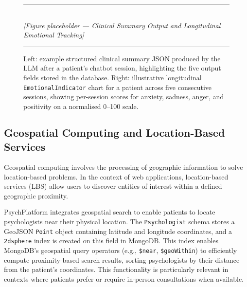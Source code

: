 \begin{figure}[H]
  \centering
  \rule{0.85\textwidth}{0.4pt}\\[6pt]
  {\small\itshape [Figure placeholder — Clinical Summary Output and Longitudinal Emotional Tracking]}
  \rule{0.85\textwidth}{0.4pt}
  \caption{Left: example structured clinical summary JSON produced by the LLM
           after a patient's chatbot session, highlighting the five output fields
           stored in the database. Right: illustrative longitudinal
           \texttt{EmotionalIndicator} chart for a patient across five
           consecutive sessions, showing per-session scores for anxiety, sadness,
           anger, and positivity on a normalised 0--100 scale.}
  \label{fig:emotion-tracking}
\end{figure}

\subsection{Geospatial Computing and Location-Based Services}
\label{subsec:geo}

Geospatial computing involves the processing of geographic information to solve
location-based problems. In the context of web applications, location-based
services (LBS) allow users to discover entities of interest within a defined
geographic proximity.

PsychPlatform integrates geospatial search to enable patients to locate
psychologists near their physical location. The \texttt{Psychologist} schema
stores a GeoJSON \texttt{Point} object containing latitude and longitude
coordinates, and a \texttt{2dsphere} index is created on this field in MongoDB.
This index enables MongoDB's geospatial query operators (e.g., \texttt{\$near},
\texttt{\$geoWithin}) to efficiently compute proximity-based search results,
sorting psychologists by their distance from the patient's coordinates. This
functionality is particularly relevant in contexts where patients prefer or
require in-person consultations when available.

